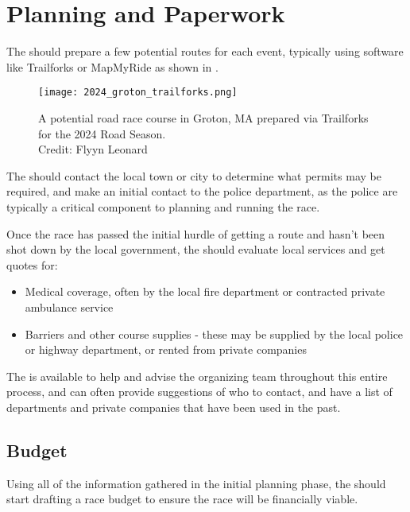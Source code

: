 \section{Planning and Paperwork}

The  should prepare a few potential routes for each event,
typically using software like Trailforks or MapMyRide as shown in .

\begin{figure}[h]
  \texttt{[image: 2024\_groton\_trailforks.png]}
  \caption[Road race course map in Trailforks]{
    A potential road race course in Groton, MA
    prepared via Trailforks for the 2024 Road Season.\\
    Credit: Flyyn Leonard}
\end{figure}

The  should contact the local town or city
to determine what permits may be required, and make an initial contact to the police department,
as the police are typically a critical component to planning and running the race.

Once the race has passed the initial hurdle of getting a route and hasn't been shot down by the local government,
the  should evaluate local services and get quotes for:

\begin{itemize}
  \item Medical coverage, often by the local fire department or contracted private ambulance service
  \item Barriers and other course supplies - these may be supplied by the local police or highway department, or rented from private companies
\end{itemize}

The  is available to help and advise the organizing team throughout this entire process,
and can often provide suggestions of who to contact, and have a list of departments and private companies that have been used in the past.

\subsection{Budget}

Using all of the information gathered in the initial planning phase, the  should start drafting a race budget
to ensure the race will be financially viable.

